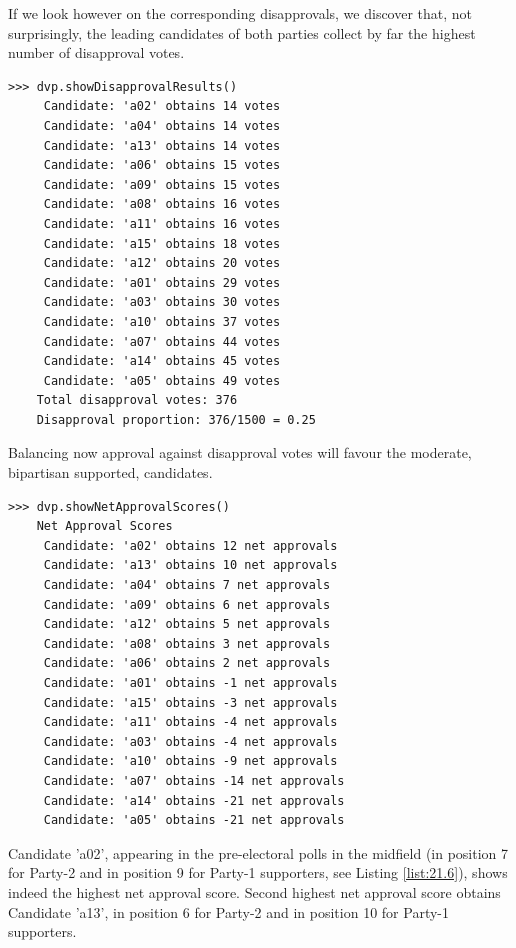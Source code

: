 If we look however on the corresponding disapprovals, we discover that, not surprisingly, the leading candidates of both parties collect by far the highest number of disapproval votes. 
\begin{lstlisting}
>>> dvp.showDisapprovalResults()
     Candidate: 'a02' obtains 14 votes
     Candidate: 'a04' obtains 14 votes
     Candidate: 'a13' obtains 14 votes
     Candidate: 'a06' obtains 15 votes
     Candidate: 'a09' obtains 15 votes
     Candidate: 'a08' obtains 16 votes
     Candidate: 'a11' obtains 16 votes
     Candidate: 'a15' obtains 18 votes
     Candidate: 'a12' obtains 20 votes
     Candidate: 'a01' obtains 29 votes
     Candidate: 'a03' obtains 30 votes
     Candidate: 'a10' obtains 37 votes
     Candidate: 'a07' obtains 44 votes
     Candidate: 'a14' obtains 45 votes
     Candidate: 'a05' obtains 49 votes
    Total disapproval votes: 376
    Disapproval proportion: 376/1500 = 0.25
\end{lstlisting}
Balancing now approval against disapproval votes will favour the moderate, bipartisan supported, candidates.
\begin{lstlisting}
>>> dvp.showNetApprovalScores()
    Net Approval Scores
     Candidate: 'a02' obtains 12 net approvals
     Candidate: 'a13' obtains 10 net approvals
     Candidate: 'a04' obtains 7 net approvals
     Candidate: 'a09' obtains 6 net approvals
     Candidate: 'a12' obtains 5 net approvals
     Candidate: 'a08' obtains 3 net approvals
     Candidate: 'a06' obtains 2 net approvals
     Candidate: 'a01' obtains -1 net approvals
     Candidate: 'a15' obtains -3 net approvals
     Candidate: 'a11' obtains -4 net approvals
     Candidate: 'a03' obtains -4 net approvals
     Candidate: 'a10' obtains -9 net approvals
     Candidate: 'a07' obtains -14 net approvals
     Candidate: 'a14' obtains -21 net approvals
     Candidate: 'a05' obtains -21 net approvals
\end{lstlisting}
Candidate 'a02', appearing in the pre-electoral polls in the midfield (in position 7 for Party-2 and in position 9 for Party-1 supporters, see Listing \ref{list:21.6}), shows indeed the highest net approval score. Second highest net approval score obtains Candidate 'a13', in  position 6 for Party-2 and in position 10 for Party-1 supporters.

